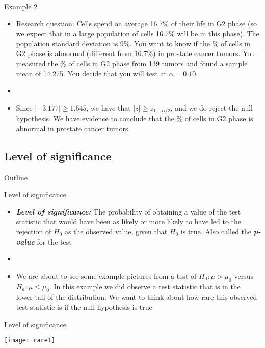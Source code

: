 \documentclass[xcolor=dvipsnames]{beamer}
\begin{document}
\begin{frame}{Example 2}
	\begin{itemize}
		\item Research question: Cells spend on average 16.7\% of their life in G2 phase (so we expect that in a large population of cells 16.7\% will be in this phase). The population standard deviation is 9\%. You want to know if the \% of cells in G2 phase is abnormal (different from 16.7\%) in prostate cancer tumors. You measured the \% of cells in G2 phase from 139 tumors and found a sample mean of 14.275. You decide that you will test at $\alpha = 0.10$.
		
		\item[]
		
		\item Since $|-3.177| \geq 1.645$, we have that $|z| \geq z_{1-\alpha / 2}$, and we do reject the null hypothesis. We have evidence to conclude that the \% of cells in G2 phase is abnormal in prostate cancer tumors. 
	\end{itemize}
\end{frame}

\subsection{Level of significance}
\begin{frame}{Outline}
\tableofcontents[currentsection,subsectionstyle=show/shaded/hide]
\end{frame}

\begin{frame}{Level of significance}
	\begin{itemize}
		\item \textbf{\emph{Level of significance:}} The probability of obtaining a value of the test statistic that would have been as likely or more likely to have led to the rejection of $H_0$ as the observed value, given that $H_0$ is true. Also called the \textbf{\emph{p-value}} for the test
		\item[]
		\item We are about to see some example pictures from a test of $H_0: \mu > \mu_0$ versus $H_a: \mu \leq \mu_0$. In this example we did observe a test statistic that is in the lower-tail of the distribution. We want to think about how rare this observed test statistic is if the null hypothesis is true
	\end{itemize}
\end{frame}

\begin{frame}{Level of significance}
	\begin{center}
		\texttt{[image: rare1]}
	\end{center}
\end{frame}
\end{document}
